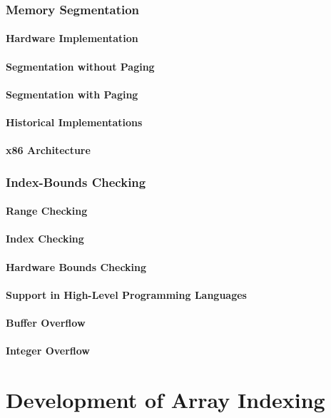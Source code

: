 \documentclass[12pt, oneside]{book}
\begin{document}
	\subsection{Memory Segmentation}
	\subsubsection{Hardware Implementation}
	\subsubsection{Segmentation without Paging}
	\subsubsection{Segmentation with Paging}
	\subsubsection{Historical Implementations}
	\subsubsection{x86 Architecture}
	\subsection{Index-Bounds Checking}
	\subsubsection{Range Checking}
	\subsubsection{Index Checking}
	\subsubsection{Hardware Bounds Checking}
	\subsubsection{Support in High-Level Programming Languages}
	\subsubsection{Buffer Overflow}
	\subsubsection{Integer Overflow}
	\chapter{Development of Array Indexing}
\end{document}

